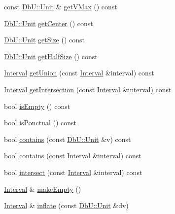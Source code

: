 \begin{DoxyCompactItemize}
\item 
const \hyperlink{group__DbUGroup_ga4fbfa3e8c89347af76c9628ea06c4146}{Db\+U\+::\+Unit} \& \hyperlink{classHurricane_1_1Interval_a2f5ec659fde913492f89dc215001acb2}{get\+V\+Max} () const
\item 
\hyperlink{group__DbUGroup_ga4fbfa3e8c89347af76c9628ea06c4146}{Db\+U\+::\+Unit} \hyperlink{classHurricane_1_1Interval_a6d12d0404054c7ccadab1afa6683a561}{get\+Center} () const
\item 
\hyperlink{group__DbUGroup_ga4fbfa3e8c89347af76c9628ea06c4146}{Db\+U\+::\+Unit} \hyperlink{classHurricane_1_1Interval_a61d877fee3986f93c357910cd63f1caa}{get\+Size} () const
\item 
\hyperlink{group__DbUGroup_ga4fbfa3e8c89347af76c9628ea06c4146}{Db\+U\+::\+Unit} \hyperlink{classHurricane_1_1Interval_abe66d75c0854ca0a76189801f0f7d0e3}{get\+Half\+Size} () const
\item 
\hyperlink{classHurricane_1_1Interval}{Interval} \hyperlink{classHurricane_1_1Interval_adaddabee8381860b0d6913ce39bc1911}{get\+Union} (const \hyperlink{classHurricane_1_1Interval}{Interval} \&interval) const
\item 
\hyperlink{classHurricane_1_1Interval}{Interval} \hyperlink{classHurricane_1_1Interval_ad9baf434d669fddf9cd30aa74e0c4486}{get\+Intersection} (const \hyperlink{classHurricane_1_1Interval}{Interval} \&interval) const
\item 
bool \hyperlink{classHurricane_1_1Interval_a5bf0292743d02f861a194c48c823c7ce}{is\+Empty} () const
\item 
bool \hyperlink{classHurricane_1_1Interval_acfc27bb7442f359db7d04c72fa8edeb8}{is\+Ponctual} () const
\item 
bool \hyperlink{classHurricane_1_1Interval_a1f58204f81cd59ae8345e0efd2482bbb}{contains} (const \hyperlink{group__DbUGroup_ga4fbfa3e8c89347af76c9628ea06c4146}{Db\+U\+::\+Unit} \&v) const
\item 
bool \hyperlink{classHurricane_1_1Interval_ae86edb6867cf55459325cc35d971afbd}{contains} (const \hyperlink{classHurricane_1_1Interval}{Interval} \&interval) const
\item 
bool \hyperlink{classHurricane_1_1Interval_acbaccbdd6649a32dd457455d277370f8}{intersect} (const \hyperlink{classHurricane_1_1Interval}{Interval} \&interval) const
\item 
\hyperlink{classHurricane_1_1Interval}{Interval} \& \hyperlink{classHurricane_1_1Interval_a1e171021dcd5c0dc7e8afb0b2324c5ee}{make\+Empty} ()
\item 
\hyperlink{classHurricane_1_1Interval}{Interval} \& \hyperlink{classHurricane_1_1Interval_a142c3ec37ebe74c253b3fe0039ef2143}{inflate} (const \hyperlink{group__DbUGroup_ga4fbfa3e8c89347af76c9628ea06c4146}{Db\+U\+::\+Unit} \&dv)

\end{DoxyCompactItemize}
